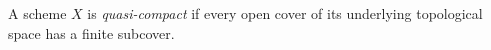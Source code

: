 
A scheme $X$ is \emph{quasi-compact} if every open cover of its underlying topological space has a finite subcover.

